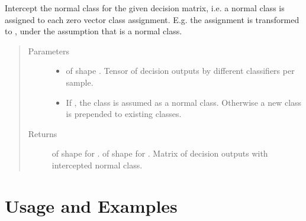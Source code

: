 \documentclass[letterpaper,10pt,english]{sphinxmanual}
\begin{document}
\begin{fulllineitems}
\label{\detokenize{pusion.util.transformer:pusion.util.transformer.intercept_normal_class_in_tensor}}
\sphinxAtStartPar
Intercept the normal class for the given decision matrix, i.e. a normal class is assigned to each zero vector
class assignment. E.g. the assignment \sphinxtitleref{{[}0,0,0,0{]}} is transformed to \sphinxtitleref{{[}1,0,0,0{]}}, under the assumption that 
is a normal class.
\begin{quote}\begin{description}
\item[{Parameters}] \leavevmode\begin{itemize}
\item {} 
\sphinxAtStartPar
{} \textendash{}  of shape .
Tensor of decision outputs by different classifiers per sample.

\item {} 
\sphinxAtStartPar
{} \textendash{} If , the class  is assumed as a normal class. Otherwise a new class is prepended to
existing classes.

\end{itemize}

\item[{Returns}] \leavevmode
\sphinxAtStartPar
{} of shape  for .
 of shape  for .
Matrix of decision outputs with intercepted normal class.

\end{description}\end{quote}

\end{fulllineitems}



\chapter{Usage and Examples}
\label{\detokenize{usage_and_examples:usage-and-examples}}\label{\detokenize{usage_and_examples::doc}}
\end{document}
